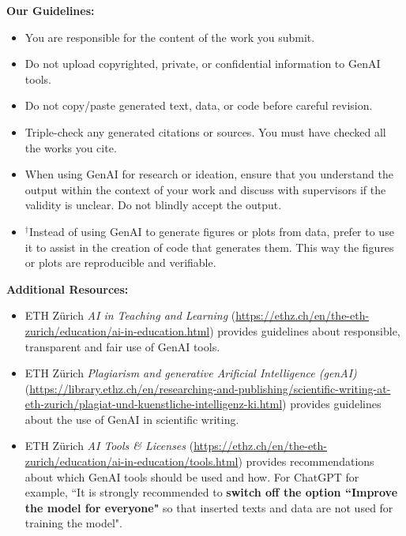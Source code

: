 \vspace{2em}

\textbf{Our Guidelines:}
\noindent
\begin{itemize}[itemsep=3pt, parsep=0pt]
    \item You are responsible for the content of the work you submit.
    \item Do not upload copyrighted, private, or confidential information to GenAI tools.
    \item Do not copy/paste generated text, data, or code before careful revision.
    \item Triple-check any generated citations or sources. You must have checked all the works you cite.
    \item When using GenAI for research or ideation, ensure that you understand the output within the context of your work and discuss with supervisors if the validity is unclear. Do not blindly accept the output.
    \item $^{\dagger}$Instead of using GenAI to generate figures or plots from data, prefer to use it to assist in the creation of code that generates them. This way the figures or plots are reproducible and verifiable.
\end{itemize}


\textbf{Additional Resources:}
\noindent
\begin{itemize}[itemsep=3pt, parsep=0pt]
    \item ETH Z\"urich \textit{AI in Teaching and Learning} (\url{https://ethz.ch/en/the-eth-zurich/education/ai-in-education.html}) provides guidelines about responsible, transparent and fair use of GenAI tools.
    \item ETH Z\"urich \textit{Plagiarism and generative Arificial Intelligence (genAI)} (\url{https://library.ethz.ch/en/researching-and-publishing/scientific-writing-at-eth-zurich/plagiat-und-kuenstliche-intelligenz-ki.html}) provides guidelines about the use of GenAI in scientific writing.
    \item ETH Z\"urich \textit{AI Tools \& Licenses} (\url{https://ethz.ch/en/the-eth-zurich/education/ai-in-education/tools.html}) provides recommendations about which GenAI tools should be used and how. For ChatGPT for example, ``It is strongly recommended to \textbf{switch off the option ``Improve the model for everyone"} so that inserted texts and data are not used for training the model".
\end{itemize}
